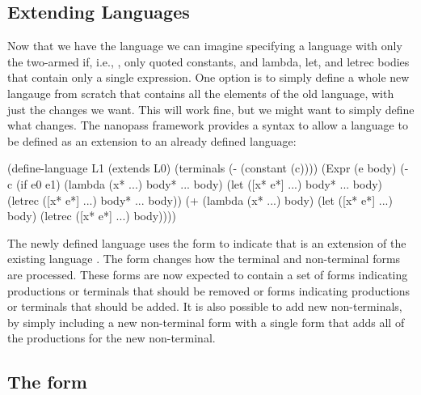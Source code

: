 \documentclass[letterpaper,10pt]{article}
\begin{document}
\subsection{Extending Languages}

Now that we have the  language we can imagine specifying a language
with only the two-armed if, i.e., , only quoted
constants, and lambda, let, and letrec bodies that contain only a single
expression.
One option is to simply define a whole new langauge from scratch that contains
all the elements of the old language, with just the changes we want.
This will work fine, but we might want to simply define what changes.
The nanopass framework provides a syntax to allow a language to be defined as
an extension to an already defined language:

\begin{schemedisplay}
(define-language L1
  (extends L0)
  (terminals
    (- (constant (c))))
  (Expr (e body)
    (- c
       (if e0 e1)
       (lambda (x* ...) body* ... body)
       (let ([x* e*] ...) body* ... body)
       (letrec ([x* e*] ...) body* ... body))
    (+ (lambda (x* ...) body)
       (let ([x* e*] ...) body)
       (letrec ([x* e*] ...) body))))
\end{schemedisplay}

The newly defined language uses the  form to indicate that
 is an extension of the existing language .
The  form changes how the terminal and non-terminal forms are
processed.
These forms are now expected to contain a set of \scheme{-} forms indicating
productions or terminals that should be removed or \scheme{+} forms indicating
productions or terminals that should be added.
It is also possible to add new non-terminals, by simply including a new
non-terminal form with a single \scheme{+} form that adds all of the
productions for the new non-terminal.

\begin{schemeregion}
\subsection{The  form}
\end{schemeregion}
\end{document}
